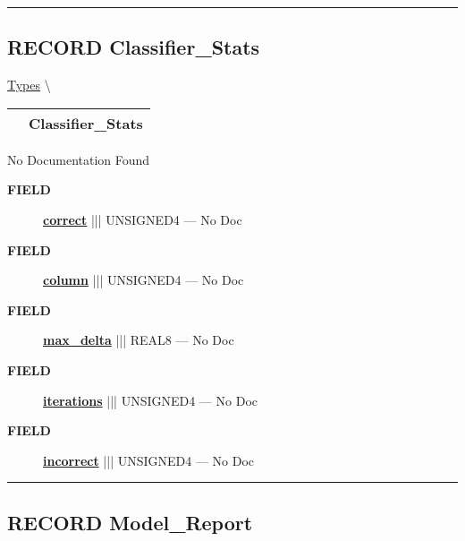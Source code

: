 \rule{\linewidth}{0.5pt}
\subsection*{\textsf{\colorbox{headtoc}{\color{white} RECORD}
Classifier\_Stats}}

\hypertarget{ecldoc:logisticregression.types.classifier_stats}{}
\hspace{0pt} \hyperlink{ecldoc:LogisticRegression.Types}{Types} \textbackslash 

{\renewcommand{\arraystretch}{1.5}
\begin{tabularx}{\textwidth}{|>{\raggedright\arraybackslash}l|X|}
\hline
\hspace{0pt}\mytexttt{\color{red} } & \textbf{Classifier\_Stats} \\
\hline
\end{tabularx}
}

\par





No Documentation Found







\par
\begin{description}
\item [\colorbox{tagtype}{\color{white} \textbf{\textsf{FIELD}}}] \textbf{\underline{correct}} ||| UNSIGNED4 --- No Doc
\item [\colorbox{tagtype}{\color{white} \textbf{\textsf{FIELD}}}] \textbf{\underline{column}} ||| UNSIGNED4 --- No Doc
\item [\colorbox{tagtype}{\color{white} \textbf{\textsf{FIELD}}}] \textbf{\underline{max\_delta}} ||| REAL8 --- No Doc
\item [\colorbox{tagtype}{\color{white} \textbf{\textsf{FIELD}}}] \textbf{\underline{iterations}} ||| UNSIGNED4 --- No Doc
\item [\colorbox{tagtype}{\color{white} \textbf{\textsf{FIELD}}}] \textbf{\underline{incorrect}} ||| UNSIGNED4 --- No Doc
\end{description}





\rule{\linewidth}{0.5pt}
\subsection*{\textsf{\colorbox{headtoc}{\color{white} RECORD}
Model\_Report}}

